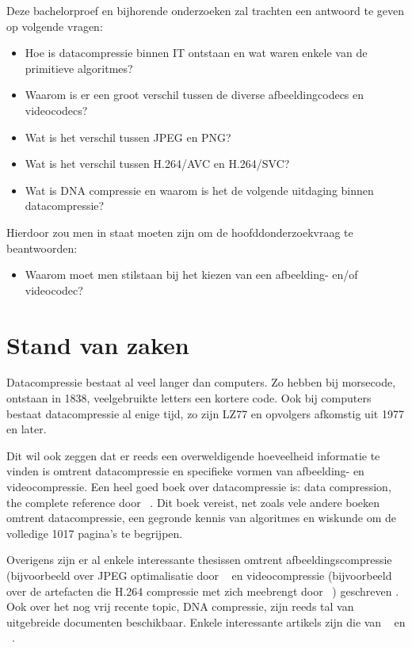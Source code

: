 Deze bachelorproef en bijhorende onderzoeken zal trachten een antwoord te geven op volgende vragen: 
\begin{itemize}
    \item{Hoe is datacompressie binnen IT ontstaan en wat waren enkele van de primitieve algoritmes?}
     \item{Waarom is er een groot verschil tussen de diverse afbeeldingcodecs en videocodecs?}
     \item{Wat is het verschil tussen JPEG en PNG?}
      \item{Wat is het verschil tussen H.264/AVC en H.264/SVC?}
      \item{Wat is DNA compressie en waarom is het de volgende uitdaging binnen datacompressie?}
\end{itemize}
Hierdoor zou men in staat moeten zijn om de hoofddonderzoekvraag te beantwoorden:  
\begin{itemize}
    \item{Waarom moet men stilstaan bij het kiezen van een afbeelding- en/of videocodec?}
\end{itemize}

\section{Stand van zaken}
\label{sec:stand-van-zaken}

Datacompressie bestaat al veel langer dan computers. Zo hebben bij morsecode, ontstaan in 1838, veelgebruikte letters een kortere code. Ook bij computers bestaat datacompressie al enige tijd, zo zijn LZ77 en opvolgers afkomstig uit 1977 en later. \autocite{Riha2011} 

Dit wil ook zeggen dat er reeds een overweldigende hoeveelheid informatie te vinden is omtrent datacompressie en specifieke vormen van afbeelding- en videocompressie. Een heel goed boek over datacompressie is: data compression, the complete reference door  ~\textcite{Salomon2006}. Dit boek vereist, net zoals vele andere boeken omtrent datacompressie,  een gegronde kennis van algoritmes en wiskunde om de volledige 1017 pagina's te begrijpen.

Overigens zijn er al enkele interessante thesissen omtrent afbeeldingscompressie (bijvoorbeeld over JPEG optimalisatie door ~\textcite{Wahlstrom2015} en videocompressie (bijvoorbeeld over de artefacten die H.264 compressie met zich meebrengt door  ~\textcite{Rakesh2013}) geschreven . Ook over het nog vrij recente topic, DNA compressie, zijn reeds tal van uitgebreide documenten beschikbaar. Enkele interessante artikels zijn die van ~\textcite{Afify2011} en ~\textcite{Kuruppu2012}. 

